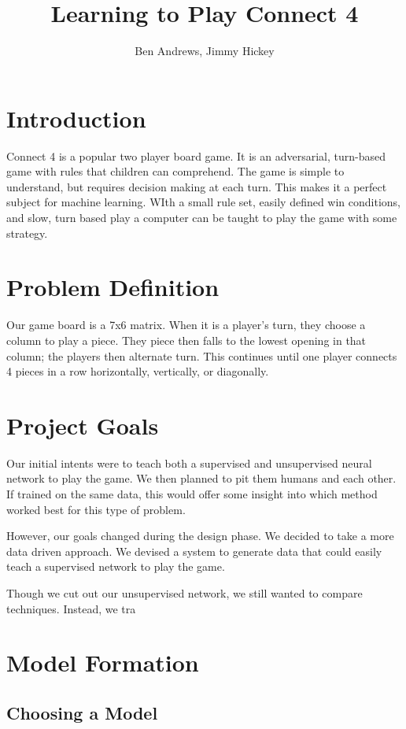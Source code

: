\documentclass[12pt]{article}
\title{Learning to Play Connect 4}
\author{Ben Andrews, Jimmy Hickey}
\begin{document}
	\maketitle
	\tableofcontents
	\clearpage
	
\section{Introduction}
Connect 4 is a popular two player board game. It is an adversarial, turn-based game with rules that children can comprehend. The game is simple to understand, but requires decision making at each turn. This makes it a perfect subject for machine learning. WIth a small rule set, easily defined win conditions, and slow, turn based play a computer can be taught to play the game with some strategy.

\section{Problem Definition}
Our game board is a 7x6 matrix. When it is a player's turn, they choose a column to play a piece. They piece then falls to the lowest opening in that column; the players then alternate turn. This continues until one player connects 4 pieces in a row horizontally, vertically, or diagonally.

\section{Project Goals}
Our initial intents were to teach both a supervised and unsupervised neural network to play the game. We then planned to pit them humans and each other. If trained on the same data, this would offer some insight into which method worked best for this type of problem.

However, our goals changed during the design phase. We decided to take a more data driven approach. We devised a system to generate data that could easily teach a supervised network to play the game.

Though we cut out our unsupervised network, we still wanted to compare techniques. Instead, we tra

\section{Model Formation}
\subsection{Choosing a Model}
\end{document}
